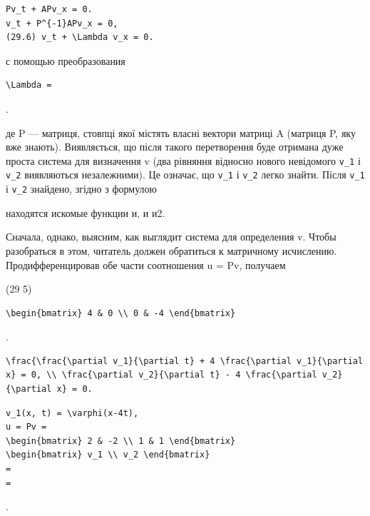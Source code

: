 \documentclass[
  ukrainian,
]{article}
\begin{document}
\begin{verbatim}
Pv_t + APv_x = 0.
v_t + P^{-1}APv_x = 0,
(29.6) v_t + \Lambda v_x = 0.
\end{verbatim}

с помощью преобразования

\begin{verbatim}
\Lambda =
\end{verbatim}

.

де P --- матриця, стовпці якої містять власні вектори матриці A (матриця
P, яку вже знають). Виявляється, що після такого перетворення буде
отримана дуже проста система для визначення v (два рівняння відносно
нового невідомого \texttt{v\_1} і \texttt{v\_2} виявляються
незалежними). Це означає, що \texttt{v\_1} і \texttt{v\_2} легко знайти.
Після \texttt{v\_1} і \texttt{v\_2} знайдено, згідно з формулою

находятся искомые функции и, и и2.

Сначала, однако, выясним, как выглядит система для определения v. Чтобы
разобраться в этом, читатель должен обратиться к матричному исчислению.
Продифференцировав обе части соотношения u = Pv, получаем

(29 5)

\begin{verbatim}
\begin{bmatrix} 4 & 0 \\ 0 & -4 \end{bmatrix}
\end{verbatim}

.

\begin{verbatim}
\frac{\frac{\partial v_1}{\partial t} + 4 \frac{\partial v_1}{\partial x} = 0, \\ \frac{\partial v_2}{\partial t} - 4 \frac{\partial v_2}{\partial x} = 0.
\end{verbatim}

\begin{verbatim}
v_1(x, t) = \varphi(x-4t),
u = Pv =
\begin{bmatrix} 2 & -2 \\ 1 & 1 \end{bmatrix}
\begin{bmatrix} v_1 \\ v_2 \end{bmatrix}
=
=
\end{verbatim}

.
\end{document}

